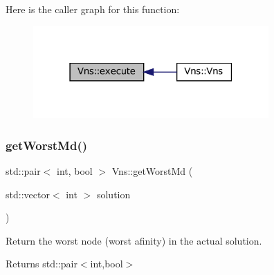 Here is the caller graph for this function\+:\nopagebreak
\begin{figure}[H]
\begin{center}
\leavevmode
\includegraphics[width=255pt]{classVns_aece2ea2cb74dd3608570321fcbb2de0c_icgraph}
\end{center}
\end{figure}
\mbox{\label{classVns_a2349cd809a0925058a35dea1722c7c23}} 
\subsubsection{\texorpdfstring{get\+Worst\+Md()}{getWorstMd()}}
{\footnotesize\ttfamily std\+::pair$<$ int, bool $>$ Vns\+::get\+Worst\+Md (\begin{DoxyParamCaption}\item[{std\+::vector$<$ int $>$}]{solution }\end{DoxyParamCaption})}



Return the worst node (worst afinity) in the actual solution. 

\begin{DoxyReturn}{Returns}
std\+::pair$<$int,bool$>$ 
\end{DoxyReturn}

